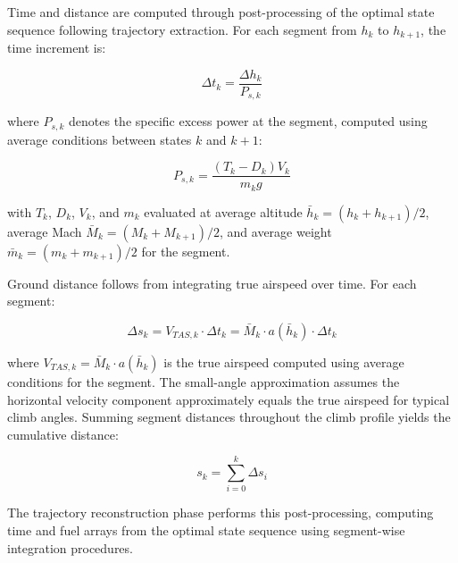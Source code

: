 
Time and distance are computed through post-processing of the optimal state sequence following trajectory extraction. For each segment from $h_k$ to $h_{k+1}$, the time increment is:

\begin{equation}
\Delta t_k = \frac{\Delta h_k}{P_{s,k}}
\end{equation}

where $P_{s,k}$ denotes the specific excess power at the segment, computed using average conditions between states $k$ and $k+1$:

\begin{equation}
P_{s,k} = \frac{(T_k - D_k) V_k}{m_k g}
\end{equation}

with $T_k$, $D_k$, $V_k$, and $m_k$ evaluated at average altitude $\bar{h}_k = (h_k + h_{k+1})/2$, average Mach $\bar{M}_k = (M_k + M_{k+1})/2$, and average weight $\bar{m}_k = (m_k + m_{k+1})/2$ for the segment.

Ground distance follows from integrating true airspeed over time. For each segment:

\begin{equation}
\Delta s_k = V_{TAS,k} \cdot \Delta t_k = \bar{M}_k \cdot a(\bar{h}_k) \cdot \Delta t_k
\end{equation}

where $V_{TAS,k} = \bar{M}_k \cdot a(\bar{h}_k)$ is the true airspeed computed using average conditions for the segment. The small-angle approximation assumes the horizontal velocity component approximately equals the true airspeed for typical climb angles. Summing segment distances throughout the climb profile yields the cumulative distance:

\begin{equation}
s_k = \sum_{i=0}^{k} \Delta s_i
\end{equation}

The trajectory reconstruction phase performs this post-processing, computing time and fuel arrays from the optimal state sequence using segment-wise integration procedures.
